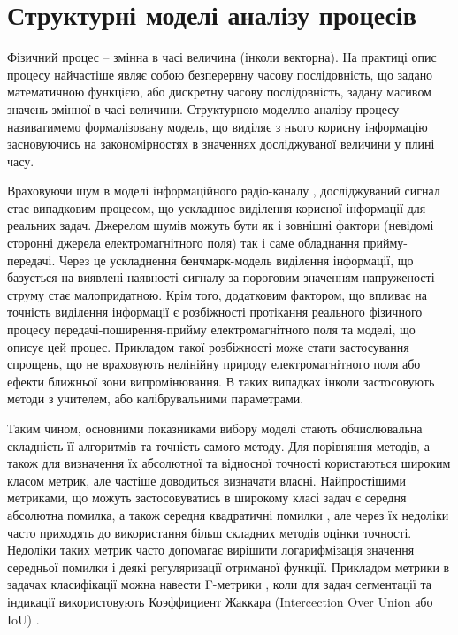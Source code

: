 \section{Структурні моделі аналізу процесів}

Фізичний процес -- змінна в часі величина (інколи векторна). На практиці
опис процесу найчастіше являє собою безперервну часову послідовність, 
що задано математичною функцією, або дискретну часову послідовність, задану 
масивом значень змінної в часі величини. Структурною моделлю аналізу процесу
називатимемо формалізовану модель, що виділяє з нього корисну інформацію 
засновуючись на закономірностях в значеннях досліджуваної величини у 
плині часу.

Враховуючи шум в моделі інформаційного радіо-каналу \cite{imp:Shihovcev2011}, 
досліджуваний сигнал стає випадковим процесом, що ускладнює виділення 
корисної інформації для реальних задач. Джерелом шумів можуть бути як і 
зовнішні фактори (невідомі сторонні джерела електромагнітного поля) так і
саме обладнання прийму-передачі. Через це ускладнення бенчмарк-модель 
виділення інформації, що базується на виявлені наявності сигналу за 
пороговим значенням напруженості струму стає малопридатною. Крім того,
додатковим фактором, що впливає на точність виділення інформації є розбіжності
протікання реального фізичного процесу передачі-поширення-прийму 
електромагнітного поля та моделі, що описує цей процес. Прикладом такої 
розбіжності може стати застосування спрощень, що не враховують нелінійну 
природу електромагнітного поля або ефекти ближньої зони випромінювання.
В таких випадках інколи застосовують методи з учителем, або калібрувальними 
параметрами.

Таким чином, основними показниками вибору моделі стають обчислювальна 
складність її алгоритмів та точність самого методу. Для порівняння методів,
а також для визначення їх абсолютної та відносної точності користаються 
широким класом метрик, але частіше доводиться визначати власні. 
Найпростішими метриками, що можуть застосовуватись в широкому класі задач є 
середня абсолютна помилка, а також середня квадратичні помилки 
\cite{imp:Willmott2005}, але через їх недоліки часто приходять до 
використання більш складних методів оцінки точності. Недоліки таких метрик 
часто допомагає вирішити логарифмізація значення середньої помилки і деякі 
регуляризації отриманої функції. Прикладом метрики в задачах класифікації 
можна навести F-метрики \cite{imp:Tharwat2018}, коли для задач сегментації та 
індикації використовують Коэффициент Жаккара (Intercection Over Union або 
IoU) \cite{imp:Jaccard1901}.

